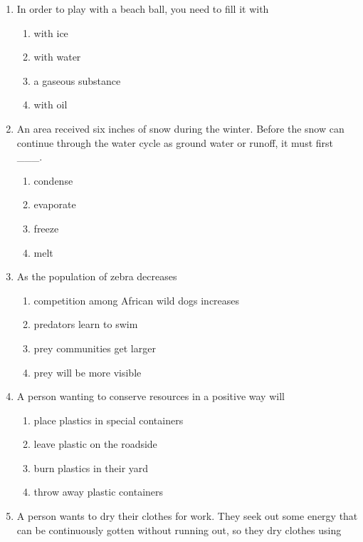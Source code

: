 \documentclass[12pt]{article}
\begin{document}
\begin{enumerate}[label=\arabic*.]
\begin{enumerate}[label=(\alph*)]
    \item share two covalent bonds.
    \item have a definite shape.
    \item share a pair of neutrons.
    \item have two free electrons.
\end{enumerate}
\item In order to play with a beach ball, you need to fill it with
\begin{enumerate}[label=(\alph*)]
    \item with ice
    \item with water
    \item a gaseous substance
    \item with oil
\end{enumerate}
\item An area received six inches of snow during the winter. Before the snow can continue through the water cycle as ground water or runoff, it must first \_\_\_.
\begin{enumerate}[label=(\alph*)]
    \item condense
    \item evaporate
    \item freeze
    \item melt
\end{enumerate}
\item As the population of zebra decreases
\begin{enumerate}[label=(\alph*)]
    \item competition among African wild dogs increases
    \item predators learn to swim
    \item prey communities get larger
    \item prey will be more visible
\end{enumerate}
\item A person wanting to conserve resources in a positive way will
\begin{enumerate}[label=(\alph*)]
    \item place plastics in special containers
    \item leave plastic on the roadside
    \item burn plastics in their yard
    \item throw away plastic containers
\end{enumerate}
\item A person wants to dry their clothes for work. They seek out some energy that can be continuously gotten without running out, so they dry clothes using

\end{enumerate}
\end{document}
